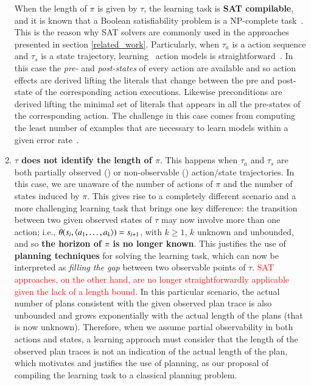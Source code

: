 \begin{enumerate}
    When the length of $\pi$ is given by $\tau$, the learning task is \textbf{SAT compilable}, and it is known that a Boolean satisfiability problem is a NP-complete task~\cite{cook1971complexity}. This is the reason why SAT solvers are commonly used in the approaches presented in section \ref{related_work}. Particularly, when $\tau_a$ is a \FO action sequence and $\tau_s$ is a \FO state trajectory, learning \strips\ action models is straightforward~\cite{jimenez2012review}. In this case the {\em pre-} and {\em post-states} of every action are available and so action effects are derived lifting the literals that change between the pre and post-state of the corresponding action executions. Likewise preconditions are derived lifting the minimal set of literals that appears in all the pre-states of the corresponding action. The challenge in this case comes from computing the least number of examples that are necessary to learn models within a given error rate~\cite{SternJ17}.


\item \textbf{$\tau$ does not identify the length of $\pi$}. This happens when $\tau_a$ and $\tau_s$ are both partially observed (\PO) or non-observable (\NO) action/state trajectories. In this case, we are unaware of the number of actions of $\pi$ and the number of states induced by $\pi$. This gives rise to a completely different scenario and a more challenging learning task that brings one key difference: the transition between two given observed states of $\tau$ may now involve more than one action; i.e., $\theta(s_i,{\langle a_1,\ldots,a_k \rangle})=s_{i+1}$, with $k \geq 1$, $k$ unknown and unbounded, and so \textbf{the horizon of $\pi$ is no longer known}. This justifies the use of \textbf{planning techniques} for solving the learning task, which can now be interpreted as \emph{filling the gap} between two observable points of $\tau$. \textcolor{red}{SAT approaches, on the other hand, are no longer straightforwardly applicable given the lack of a length bound}. In this particular scenario, the actual number of plans consistent with the given observed plan trace is also unbounded and grows exponentially with the actual length of the plans (that is now unknown). Therefore, when we assume partial observability in both actions and states, a learning approach must consider that the length of the observed plan traces is not an indication of the actual length of the plan, which motivates and justifies the use of planning, as our proposal of compiling the learning task to a classical planning problem.


\end{enumerate}
